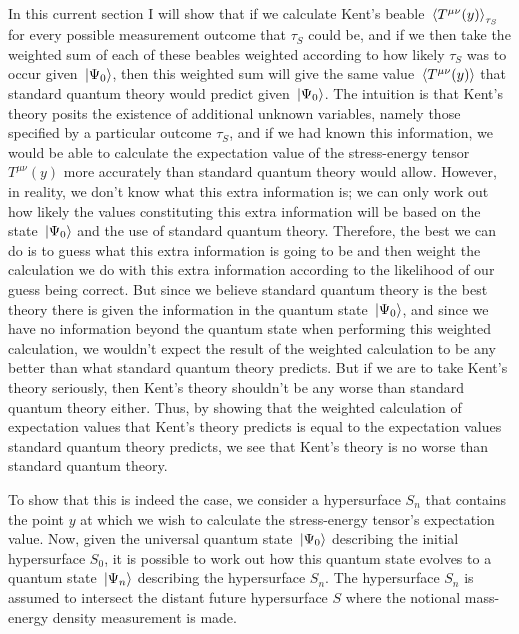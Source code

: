 In this current section I will show that if we calculate Kent's beable $\ev*{T^{\mu\nu}(y)}_{\tau_S}$ for every possible measurement outcome that $\tau_S$ could be,  and if we then take the weighted sum of each of these beables weighted according to how likely $\tau_S$ was to occur given $\ket*{\Psi_0}$, then this weighted sum will give the same value $\ev*{T^{\mu\nu}(y)}$ that standard quantum theory would predict given $\ket*{\Psi_0}$. The intuition is that Kent's theory posits the existence of additional unknown variables, namely those specified by a particular outcome $\tau_S$, and if we had known this information, we would be able to calculate the expectation value of the stress-energy tensor $T^{\mu\nu}(y)$ more accurately than standard quantum theory would allow. However, in reality, we don't know what this extra information is; we can only work out how likely the values constituting this extra information will be based on the state $\ket*{\Psi_0}$ and the use of standard quantum theory. Therefore, the best we can do is to guess what this extra information is going to be and then weight the calculation we do with this extra information according to the likelihood of our guess being correct. But since we believe standard quantum theory is the best theory there is given the information in the quantum state $\ket*{\Psi_0}$, and since we have no information beyond the quantum state when performing this weighted calculation, we wouldn't expect the result of the weighted calculation to be any better than what standard quantum theory predicts. But if we are to take Kent's theory seriously, then Kent's theory shouldn't be any worse than standard quantum theory either. Thus, by showing that the weighted calculation of expectation values that Kent's theory predicts is equal to the expectation values standard quantum theory predicts, we see that Kent's theory is no worse than standard quantum theory.

To show that this is indeed the case, we consider a hypersurface $S_n$ that contains the point $y$ at which we wish to calculate the stress-energy tensor's expectation value. Now, given the universal quantum state $\ket*{\Psi_0}$ describing the initial hypersurface $S_0$, it is possible to work out how this quantum state evolves to a quantum state $\ket*{\Psi_n}$ describing the hypersurface $S_n$. The hypersurface $S_n$ is assumed to intersect the distant future hypersurface $S$ where the notional mass-energy density measurement is made. 

